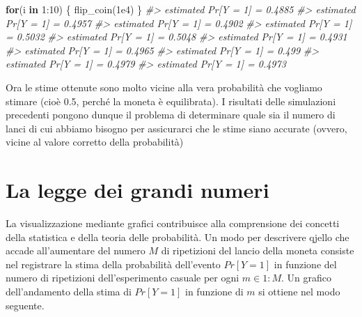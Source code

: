 \documentclass[
  11pt,
]{krantz}
\makeatletter
\newenvironment{Shaded}{\begin{snugshade}}{\end{snugshade}}
\newcommand{\CommentTok}[1]{\textcolor[rgb]{0.37,0.37,0.37}{\textit{#1}}}
\newcommand{\ControlFlowTok}[1]{\textcolor[rgb]{0.27,0.27,0.27}{\textbf{#1}}}
\newcommand{\DecValTok}[1]{\textcolor[rgb]{0.06,0.06,0.06}{#1}}
\newcommand{\FloatTok}[1]{\textcolor[rgb]{0.06,0.06,0.06}{#1}}
\newcommand{\FunctionTok}[1]{\textcolor[rgb]{0,0,0}{#1}}
\newcommand{\NormalTok}[1]{#1}
\newcommand{\SpecialCharTok}[1]{\textcolor[rgb]{0,0,0}{#1}}
\newenvironment{kframe}{%
\medskip{}
\setlength{\fboxsep}{.8em}
 \def\at@end@of@kframe{}%
 \ifinner\ifhmode%
  \def\at@end@of@kframe{\end{minipage}}%
  \begin{minipage}{\columnwidth}%
 \fi\fi%
 \def\FrameCommand##1{\hskip\@totalleftmargin \hskip-\fboxsep
 \colorbox{shadecolor}{##1}\hskip-\fboxsep
     \hskip-\linewidth \hskip-\@totalleftmargin \hskip\columnwidth}%
 \MakeFramed {\advance\hsize-\width
   \@totalleftmargin\z@ \linewidth\hsize
   \@setminipage}}%
 {\par\unskip\endMakeFramed%
 \at@end@of@kframe}
\renewenvironment{Shaded}{\begin{kframe}}{\end{kframe}}
\theoremstyle{definition}
\theoremstyle{definition}
\theoremstyle{definition}
\theoremstyle{definition}
\theoremstyle{remark}
\makeatother
\begin{document}
\begin{Shaded}
\begin{Highlighting}[]
\ControlFlowTok{for}\NormalTok{(i }\ControlFlowTok{in} \DecValTok{1}\SpecialCharTok{:}\DecValTok{10}\NormalTok{) \{}
  \FunctionTok{flip\_coin}\NormalTok{(}\FloatTok{1e4}\NormalTok{)}
\NormalTok{\}}
\CommentTok{\#\textgreater{} estimated Pr[Y = 1] = 0.4885 }
\CommentTok{\#\textgreater{} estimated Pr[Y = 1] = 0.4957 }
\CommentTok{\#\textgreater{} estimated Pr[Y = 1] = 0.4902 }
\CommentTok{\#\textgreater{} estimated Pr[Y = 1] = 0.5032 }
\CommentTok{\#\textgreater{} estimated Pr[Y = 1] = 0.5048 }
\CommentTok{\#\textgreater{} estimated Pr[Y = 1] = 0.4931 }
\CommentTok{\#\textgreater{} estimated Pr[Y = 1] = 0.4965 }
\CommentTok{\#\textgreater{} estimated Pr[Y = 1] = 0.499 }
\CommentTok{\#\textgreater{} estimated Pr[Y = 1] = 0.4979 }
\CommentTok{\#\textgreater{} estimated Pr[Y = 1] = 0.4973}
\end{Highlighting}
\end{Shaded}

Ora le stime ottenute sono molto vicine alla vera probabilità che vogliamo stimare (cioè 0.5, perché la moneta è equilibrata). I risultati delle simulazioni precedenti pongono dunque il problema di determinare quale sia il numero di lanci di cui abbiamo bisogno per assicurarci che le stime siano accurate (ovvero, vicine al valore corretto della probabilità)

\hypertarget{la-legge-dei-grandi-numeri}{%
\section{La legge dei grandi numeri}\label{la-legge-dei-grandi-numeri}}

La visualizzazione mediante grafici contribuisce alla comprensione dei concetti della statistica e della teoria delle probabilità. Un modo per descrivere qjello che accade all'aumentare del numero \(M\) di ripetizioni del lancio della moneta consiste nel registrare la stima della probabilità dell'evento \(Pr[Y = 1]\) in funzione del numero di ripetizioni dell'esperimento casuale per ogni \(m \in 1:M.\) Un grafico dell'andamento della stima di \(Pr[Y = 1]\) in funzione di \(m\) si ottiene nel modo seguente.
\end{document}
